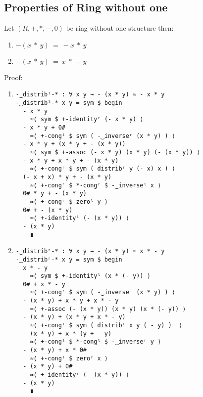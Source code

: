 \subsection{Properties of Ring without one}
Let $(R, +, *, -, 0)$ be ring without one structure then:
\begin{enumerate}
\item \(- (x\ *\ y)\ =\ - x\ *\ y\)
\item \(- (x\ *\ y)\ =\ x\ *\ - y\)
\end{enumerate}
Proof:
\begin{enumerate}
\item
\begin{verbatim}
-‿distribˡ-* : ∀ x y → - (x * y) ≈ - x * y
-‿distribˡ-* x y = sym $ begin
  - x * y                        
	≈⟨ sym $ +-identityʳ (- x * y) ⟩
  - x * y + 0#                   
	≈⟨ +-congˡ $ sym ( -‿inverseʳ (x * y) ) ⟩
  - x * y + (x * y + - (x * y))  
	≈⟨ sym $ +-assoc (- x * y) (x * y) (- (x * y)) ⟩
  - x * y + x * y + - (x * y)    
	≈⟨ +-congʳ $ sym ( distribʳ y (- x) x ) ⟩
  (- x + x) * y + - (x * y)      
	≈⟨ +-congʳ $ *-congʳ $ -‿inverseˡ x ⟩
  0# * y + - (x * y)             
	≈⟨ +-congʳ $ zeroˡ y ⟩
  0# + - (x * y)                 
	≈⟨ +-identityˡ (- (x * y)) ⟩
  - (x * y)                      
	∎
\end{verbatim}
\item
\begin{verbatim}
-‿distribʳ-* : ∀ x y → - (x * y) ≈ x * - y
-‿distribʳ-* x y = sym $ begin
  x * - y                        
	≈⟨ sym $ +-identityˡ (x * (- y)) ⟩
  0# + x * - y                   
	≈⟨ +-congʳ $ sym ( -‿inverseˡ (x * y) ) ⟩
  - (x * y) + x * y + x * - y    
	≈⟨ +-assoc (- (x * y)) (x * y) (x * (- y)) ⟩
  - (x * y) + (x * y + x * - y)  
	≈⟨ +-congˡ $ sym ( distribˡ x y ( - y) )  ⟩
  - (x * y) + x * (y + - y)      
	≈⟨ +-congˡ $ *-congˡ $ -‿inverseʳ y ⟩
  - (x * y) + x * 0#             
	≈⟨ +-congˡ $ zeroʳ x ⟩
  - (x * y) + 0#                 
	≈⟨ +-identityʳ (- (x * y)) ⟩
  - (x * y)                      
	∎
\end{verbatim}
\end{enumerate}
